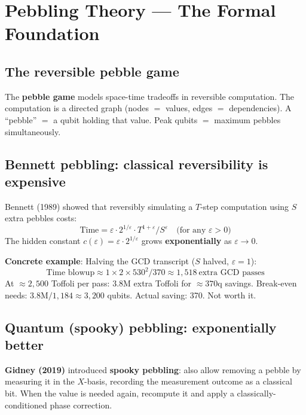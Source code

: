 \documentclass[11pt,a4paper]{article}
\begin{document}
\section{Pebbling Theory --- The Formal Foundation}
\label{sec:pebbling}

\subsection{The reversible pebble game}

The \textbf{pebble game} models space-time tradeoffs in reversible computation. The computation is
a directed graph (nodes $=$ values, edges $=$ dependencies). A ``pebble'' $=$ a qubit holding that
value. Peak qubits $=$ maximum pebbles simultaneously.

\subsection{Bennett pebbling: classical reversibility is expensive}

Bennett (1989) showed that reversibly simulating a $T$-step computation using $S$ extra pebbles
costs:
\[
  \text{Time} = \varepsilon \cdot 2^{1/\varepsilon} \cdot T^{1+\varepsilon} / S^\varepsilon \quad \text{(for any $\varepsilon > 0$)}
\]
The hidden constant $c(\varepsilon) = \varepsilon \cdot 2^{1/\varepsilon}$ grows \textbf{exponentially}
as $\varepsilon \to 0$.

\textbf{Concrete example}: Halving the GCD transcript ($S$ halved, $\varepsilon = 1$):
\[
  \text{Time blowup} \approx 1 \times 2 \times 530^2 / 370 \approx 1{,}518\ \text{extra GCD passes}
\]
At $\approx2{,}500$ Toffoli per pass: 3.8M extra Toffoli for $\approx370$q savings.
Break-even needs: $3.8\text{M} / 1{,}184 \approx 3{,}200$ qubits. Actual saving: 370. Not worth it.

\subsection{Quantum (spooky) pebbling: exponentially better}

\textbf{Gidney (2019)} introduced \textbf{spooky pebbling}: also allow removing a pebble by
measuring it in the $X$-basis, recording the measurement outcome as a classical bit. When the
value is needed again, recompute it and apply a classically-conditioned phase correction.
\end{document}
